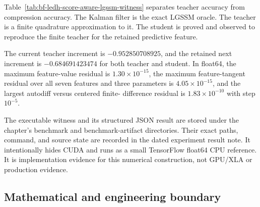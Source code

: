 Table~\ref{tab:bf-ledh-score-aware-lgssm-witness} separates teacher accuracy
from compression accuracy.  The Kalman filter is the exact LGSSM oracle.  The
teacher is a finite quadrature approximation to it.  The student is proved and
observed to reproduce the finite teacher for the retained predictive feature.
\begin{table}[H]
\centering
\caption{Two-observation 2D LGSSM value and score at
\(\theta_0=(0.72,-1.05,-0.70)\).}
\label{tab:bf-ledh-score-aware-lgssm-witness}
\end{table}

The current teacher increment is \(-0.952850708925\), and the retained next
increment is \(-0.684691423474\) for both teacher and student.  In float64, the
maximum feature-value residual is \(1.30\times10^{-15}\), the maximum
feature-tangent residual over all seven features and three parameters is
\(4.05\times10^{-15}\), and the largest autodiff versus centered finite-
difference residual is \(1.83\times10^{-10}\) with step \(10^{-5}\).

The executable witness and its structured JSON result are stored under the
chapter's benchmark and benchmark-artifact directories.  Their exact paths,
command, and source state are recorded in the dated experiment result note.
It intentionally hides CUDA and runs as a small TensorFlow float64 CPU
reference.  It is implementation evidence for this numerical construction,
not GPU/XLA or production evidence.

\subsection{Mathematical and engineering boundary}

